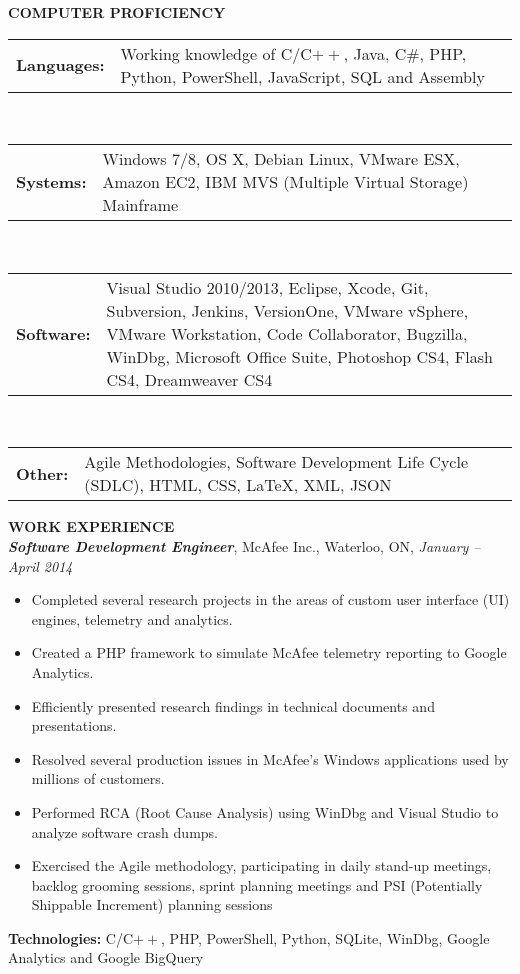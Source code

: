 \documentclass[10pt,letterpaper]{article}
\newcommand{\proficiency}[2]
{
\begin{tabular}{p{0.1\columnwidth} p{0.80\columnwidth}}
    \textbf{#1} & #2
\end{tabular}
}
\newcommand{\job}[4]
{
    \emph{\textbf{#1}}, #2, #3, \emph{#4}
}
\begin{document}
\textbf{COMPUTER PROFICIENCY} \hrulefill \\
\begin{adjustwidth}{0.1in}{0.5in}
    \proficiency{Languages:}{ Working knowledge of C/C$++$, Java, C\#, PHP, Python, PowerShell, JavaScript, SQL 
			     and Assembly }\\
    \proficiency{Systems:}  { Windows 7/8, OS X, Debian Linux, VMware ESX, Amazon EC2,
			      IBM MVS (Multiple Virtual Storage) Mainframe }\\
    \proficiency{Software:} { Visual Studio 2010/2013, Eclipse, Xcode, Git, Subversion, Jenkins, VersionOne, 
			      VMware vSphere, VMware Workstation, Code Collaborator, Bugzilla, WinDbg, 
			      Microsoft Office Suite, Photoshop CS4, Flash CS4, Dreamweaver CS4 }\\
    \proficiency{Other:}    { Agile Methodologies, Software Development Life Cycle (SDLC), HTML, CSS, \LaTeX, XML,
			      JSON }
\end{adjustwidth}
\vspace{0.5em}
\textbf{WORK EXPERIENCE} \hrulefill \\[0.5em]
\job{Software Development Engineer}{McAfee Inc.}{Waterloo, ON}{January -- April 2014}\\
\begin{adjustwidth}{0.1in}{0.5in}
    \begin{itemize}
	\item Completed several research projects in the areas of custom user interface (UI) engines, telemetry and analytics.
    	\item Created a PHP framework to simulate McAfee telemetry reporting to Google Analytics.
	\item Efficiently presented research findings in technical documents and presentations.
	\item Resolved several production issues in McAfee's Windows applications used by millions of customers.
	\item Performed RCA (Root Cause Analysis) using WinDbg and Visual Studio to analyze software crash dumps.  
 	\item Exercised the Agile methodology, participating in daily stand-up meetings, backlog grooming sessions, 
	    sprint planning meetings and PSI (Potentially Shippable Increment) planning sessions
    \end{itemize}
    \vspace{0.5em}
    \textbf{Technologies:} C/C$++$, PHP, PowerShell, Python, SQLite, WinDbg, Google Analytics and Google BigQuery 
\end{adjustwidth}
\end{document}
